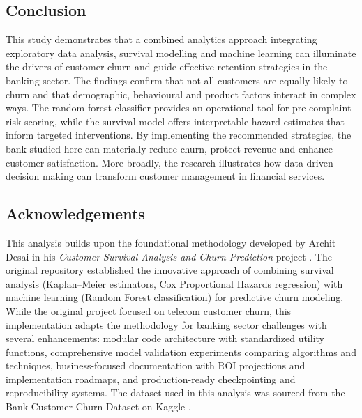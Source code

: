\documentclass[12pt]{article}
\begin{document}
\subsection{Conclusion}
This study demonstrates that a combined analytics approach integrating exploratory data analysis, survival modelling and machine learning can illuminate the drivers of customer churn and guide effective retention strategies in the banking sector.  The findings confirm that not all customers are equally likely to churn and that demographic, behavioural and product factors interact in complex ways.  The random forest classifier provides an operational tool for pre‑complaint risk scoring, while the survival model offers interpretable hazard estimates that inform targeted interventions.  By implementing the recommended strategies, the bank studied here can materially reduce churn, protect revenue and enhance customer satisfaction.  More broadly, the research illustrates how data‑driven decision making can transform customer management in financial services.

\subsection{Acknowledgements}
This analysis builds upon the foundational methodology developed by Archit Desai in his \emph{Customer Survival Analysis and Churn Prediction} project \citep{desai_customer_survival}.  The original repository established the innovative approach of combining survival analysis (Kaplan–Meier estimators, Cox Proportional Hazards regression) with machine learning (Random Forest classification) for predictive churn modeling.  While the original project focused on telecom customer churn, this implementation adapts the methodology for banking sector challenges with several enhancements: modular code architecture with standardized utility functions, comprehensive model validation experiments comparing algorithms and techniques, business-focused documentation with ROI projections and implementation roadmaps, and production-ready checkpointing and reproducibility systems.  The dataset used in this analysis was sourced from the Bank Customer Churn Dataset on Kaggle \citep{kollipara2022bank}.

\newpage


\end{document}
